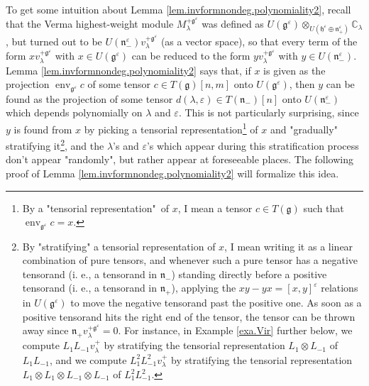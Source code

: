 \documentclass
[numbers=enddot,12pt,final,onecolumn,german,notitlepage]{scrartcl}%
\theoremstyle{definition}
\begin{document}
To get some intuition about Lemma \ref{lem.invformnondeg.polynomiality2},
recall that the Verma highest-weight module $M_{\lambda}^{+\mathfrak{g}%
^{\varepsilon}}$ was defined as $U\left(  \mathfrak{g}^{\varepsilon}\right)
\otimes_{U\left(  \mathfrak{h}^{\varepsilon}\oplus\mathfrak{n}_{+}%
^{\varepsilon}\right)  }\mathbb{C}_{\lambda}$, but turned out to be $U\left(
\mathfrak{n}_{-}^{\varepsilon}\right)  v_{\lambda}^{+\mathfrak{g}%
^{\varepsilon}}$ (as a vector space), so that every term of the form
$xv_{\lambda}^{+\mathfrak{g}^{\varepsilon}}$ with $x\in U\left(
\mathfrak{g}^{\varepsilon}\right)  $ can be reduced to the form $yv_{\lambda
}^{+\mathfrak{g}^{\varepsilon}}$ with $y\in U\left(  \mathfrak{n}%
_{-}^{\varepsilon}\right)  $. Lemma \ref{lem.invformnondeg.polynomiality2}
says that, if $x$ is given as the projection $\operatorname*{env}%
\nolimits_{\mathfrak{g}^{\varepsilon}}c$ of some tensor $c\in T\left(
\mathfrak{g}\right)  \left[  n,m\right]  $ onto $U\left(  \mathfrak{g}%
^{\varepsilon}\right)  $, then $y$ can be found as the projection of some
tensor $d\left(  \lambda,\varepsilon\right)  \in T\left(  \mathfrak{n}%
_{-}\right)  \left[  n\right]  $ onto $U\left(  \mathfrak{n}_{-}^{\varepsilon
}\right)  $ which depends polynomially on $\lambda$ and $\varepsilon$. This is
not particularly surprising, since $y$ is found from $x$ by picking a
tensorial representation\footnote{By a "tensorial representation"\ of $x$, I
mean a tensor $c\in T\left(  \mathfrak{g}\right)  $ such that
$\operatorname*{env}\nolimits_{\mathfrak{g}^{\varepsilon}}c=x$.} of $x$ and
"gradually" stratifying it\footnote{By "stratifying" a tensorial
representation of $x$, I mean writing it as a linear combination of pure
tensors, and whenever such a pure tensor has a negative tensorand (i. e., a
tensorand in $\mathfrak{n}_{-}$) standing directly before a positive tensorand
(i. e., a tensorand in $\mathfrak{n}_{+}$), applying the $xy-yx=\left[
x,y\right]  ^{\varepsilon}$ relations in $U\left(  \mathfrak{g}^{\varepsilon
}\right)  $ to move the negative tensorand past the positive one. As soon as a
positive tensorand hits the right end of the tensor, the tensor can be thrown
away since $\mathfrak{n}_{+}v_{\lambda}^{+\mathfrak{g}^{\varepsilon}}=0$. For
instance, in Example \ref{exa.Vir} further below, we compute $L_{1}%
L_{-1}v_{\lambda}^{+}$ by stratifying the tensorial representation
$L_{1}\otimes L_{-1}$ of $L_{1}L_{-1}$, and we compute $L_{1}^{2}L_{-1}%
^{2}v_{\lambda}^{+}$ by stratifying the tensorial representation $L_{1}\otimes
L_{1}\otimes L_{-1}\otimes L_{-1}$ of $L_{1}^{2}L_{-1}^{2}$.}, and the
$\lambda$'s and $\varepsilon$'s which appear during this stratification
process don't appear "randomly", but rather appear at foreseeable places. The
following proof of Lemma \ref{lem.invformnondeg.polynomiality2} will formalize
this idea.
\end{document}
